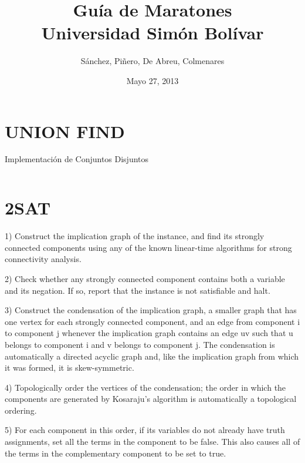 \documentclass{article}
\begin{document}
\title{Gu\'ia de Maratones \\ Universidad Sim\'on Bol\'ivar}

\author{
S\'anchez, Pi\~nero, De Abreu, Colmenares}

\date{Mayo 27, 2013}

\maketitle

\thispagestyle{empty}

\pagebreak


\section*{UNION FIND}
Implementaci\'on de Conjuntos Disjuntos
\inputminted[]{c++}{algorithms/UNIONFIND.cpp}
\newpage

\section*{2SAT}
1) Construct the implication graph of the instance, and find its strongly 
connected components using any of the known linear-time algorithms for strong connectivity analysis.

2) Check whether any strongly connected component contains both a variable 
and its negation. If so, report that the instance is not satisfiable and halt.

3) Construct the condensation of the implication graph, a smaller graph that 
has one vertex for each strongly connected component, and an edge from 
component i to component j whenever the implication graph contains an 
edge uv such that u belongs to component i and v belongs to component j. 
The condensation is automatically a directed acyclic graph and, like the 
implication graph from which it was formed, it is skew-symmetric.

4) Topologically order the vertices of the condensation; the order 
in which the components are generated by Kosaraju's algorithm is 
automatically a topological ordering.

5) For each component in this order, if its variables do not already have 
truth assignments, set all the terms in the component to be false. 
This also causes all of the terms in the complementary component to be set to true.
\end{document}
